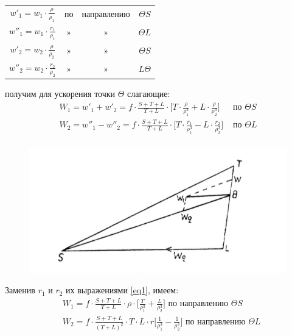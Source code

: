 \documentclass[a4paper,12pt]{article}
\begin{document}
 \begin{table}[H]
 	\centering
 	\begin{tabular}{cccc} 
 		$w'_1=w_1\cdot \frac\rho{\rho_1}$ & по & направлению & $\Theta S$ \\
 		$w''_1=w_1\cdot \frac {r_1}{\rho_1}$ & » & » & $\Theta L$\\
 $w'_2=w_2\cdot \frac {\rho}{\rho_2}$ & » & » & $\Theta S $\\
 $w''_2=w_2\cdot \frac {r_2}{\rho_2}$ & » & » & $L \Theta $\\
 	\end{tabular}
 \end{table}


получим для ускорения точки $\Theta$ слагающие:
\[
\begin{aligned}
W_1=w'_1+w'_2=f\cdot\frac{S+T+L}{T+L}\cdot\biggl[T\cdot\frac\rho{\rho_1^3}+L\cdot\frac\rho{\rho_2^3}\biggr] & \text{ по }  \Theta S \\
W_2=w''_1-w''_2=f\cdot\frac{S+T+L}{T+L}\cdot\biggl[T\cdot\frac {r_1}{\rho_1^3}-L\cdot\frac {r_2}{\rho_2^3}\biggr] & \text{ по }  \Theta L \\
\end{aligned}
\]

\begin{figure}[H]
	\centering
	\includegraphics{23.png}
	\caption{}
	\label{fig:23} 
\end{figure}

Заменив $r_1$ и $r_2$ их выражениями \eqref{eq1}, имеем:
\[
\begin{aligned}
& W_1=f\cdot\frac{S+T+L}{T+L}\cdot\rho\cdot\biggl[\frac T{\rho_1^3}+\frac L{\rho_2^3}\biggr]  \text{ по направлению }  \Theta S \\
& W_2=f\cdot\frac{S+T+L}{(T+L)^2}\cdot T \cdot L \cdot r\biggl[\frac 1{\rho_1^3}-\frac 1{\rho_2^3}\biggr] \text{ по направлению }  \Theta L \\
\end{aligned}
\]
\end{document}
